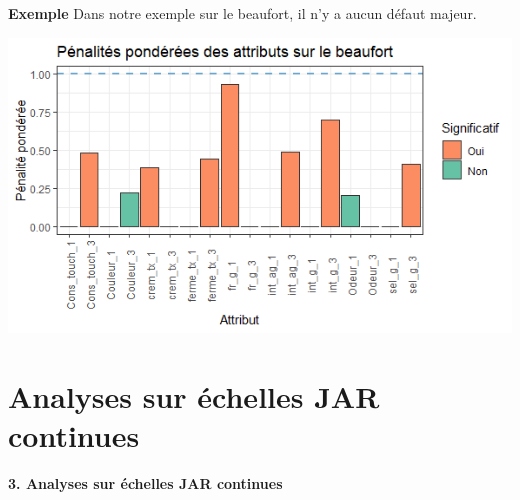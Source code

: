 \documentclass[aspectratio=169,xcolor=dvipsnames]{beamer}
\begin{document}
\begin{frame}

\begin{exampleblock}{\textbf{Exemple}}
Dans notre exemple sur le beaufort, il n'y a aucun défaut majeur.
	\begin{center}
	\includegraphics[scale=0.7]{pen_pond.png}
	\end{center}
\end{exampleblock}

\end{frame}

\section{Analyses sur échelles JAR continues}

\begin{frame}[plain]

\vfill

\begin{center}
{\huge \textcolor{nyubluedark}{\textbf{3. Analyses sur échelles JAR continues}}}
\end{center}

\vfill

\end{frame}
\end{document}
